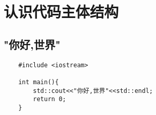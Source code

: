 \chapter{认识代码主体结构}

\section{"你好,世界"}

\begin{verbatim}
    #include <iostream>

    int main(){
        std::cout<<"你好,世界"<<std::endl;
        return 0;
    }
\end{verbatim}